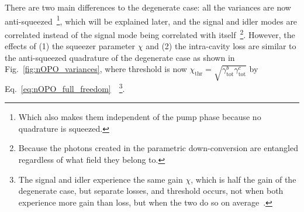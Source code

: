 There are two main differences to the degenerate case: all the variances are now anti-squeezed~\footnote{Which also makes them independent of the pump phase because no quadrature is squeezed.}, which will be explained later, and the signal and idler modes are correlated instead of the signal mode being correlated with itself~\footnote{Because the photons created in the parametric down-conversion are entangled regardless of what field they belong to.}.
However, the effects of (1) the squeezer parameter $\chi$ and (2) the intra-cavity loss are similar to the anti-squeezed quadrature of the degenerate case as shown in Fig.~\ref{fig:nOPO_variances}, where threshold is now $\chi_\text{thr}=\sqrt{\gamma^b_\text{tot}\gamma^c_\text{tot}}$ by Eq.~\ref{eq:nOPO_full_freedom}~\cite{}~\footnote{The signal and idler experience the same gain $\chi$, which is half the gain of the degenerate case, but separate losses, and threshold occurs, not when both experience more gain than loss, but when the two do so on average~\cite{}.}. %

